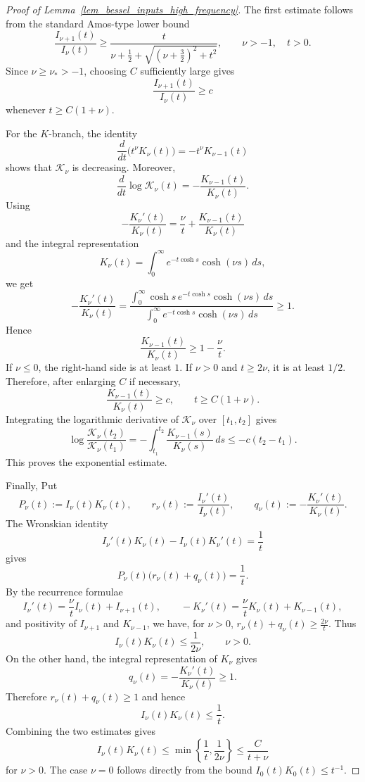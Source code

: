 \documentclass[12pt]{amsart}
\begin{document}

\begin{proof}[Proof of Lemma~\ref{lem_bessel_inputs_high_frequency}]
The first estimate follows from the standard Amos-type lower bound
\[
    \frac{I_{\nu+1}(t)}{I_\nu(t)}
    \geq
    \frac{t}
    {\nu+\frac12+\sqrt{(\nu+\frac32)^2+t^2}},
    \qquad
    \nu>-1,\quad t>0.
\]
Since $\nu\geq\nu_*>-1$, choosing $C$ sufficiently large gives
\[
    \frac{I_{\nu+1}(t)}{I_\nu(t)}
    \geq c
\]
whenever $t\geq C(1+\nu)$.

For the $K$-branch, the identity
\[
    \frac{d}{dt}\bigl(t^\nu K_\nu(t)\bigr)
    =
    -t^\nu K_{\nu-1}(t)
\]
shows that $\mathcal K_\nu$ is decreasing. Moreover,
\[
    \frac{d}{dt}\log\mathcal K_\nu(t)
    =
    -\frac{K_{\nu-1}(t)}{K_\nu(t)}.
\]
Using
\[
    -\frac{K_\nu'(t)}{K_\nu(t)}
    =
    \frac{\nu}{t}+\frac{K_{\nu-1}(t)}{K_\nu(t)}
\]
and the integral representation
\[
    K_\nu(t)=\int_0^\infty e^{-t\cosh s}\cosh(\nu s)\,ds,
\]
we get
\[
    -\frac{K_\nu'(t)}{K_\nu(t)}
    =
    \frac{\int_0^\infty \cosh s\,e^{-t\cosh s}\cosh(\nu s)\,ds}
    {\int_0^\infty e^{-t\cosh s}\cosh(\nu s)\,ds}
    \geq1.
\]
Hence
\[
    \frac{K_{\nu-1}(t)}{K_\nu(t)}
    \geq
    1-\frac{\nu}{t}.
\]
If $\nu\leq0$, the right-hand side is at least $1$. If $\nu>0$ and
$t\geq2\nu$, it is at least $1/2$. Therefore, after enlarging $C$ if necessary,
\[
    \frac{K_{\nu-1}(t)}{K_\nu(t)}\geq c,
    \qquad
    t\geq C(1+\nu).
\]
Integrating the logarithmic derivative of $\mathcal K_\nu$ over $[t_1,t_2]$
gives
\[
    \log\frac{\mathcal K_\nu(t_2)}{\mathcal K_\nu(t_1)}
    =
    -\int_{t_1}^{t_2}
    \frac{K_{\nu-1}(s)}{K_\nu(s)}\,ds
    \leq
    -c(t_2-t_1).
\]
This proves the exponential estimate.

Finally, Put
\[
    P_\nu(t):=I_\nu(t)K_\nu(t),
    \qquad
    r_\nu(t):=\frac{I_\nu'(t)}{I_\nu(t)},
    \qquad
    q_\nu(t):=-\frac{K_\nu'(t)}{K_\nu(t)}.
\]
The Wronskian identity
\[
    I_\nu'(t)K_\nu(t)-I_\nu(t)K_\nu'(t)=\frac1t
\]
gives
\[
    P_\nu(t)\bigl(r_\nu(t)+q_\nu(t)\bigr)=\frac1t.
\]
By the recurrence formulae
\[
    I_\nu'(t)=\frac{\nu}{t}I_\nu(t)+I_{\nu+1}(t),
    \qquad
    -K_\nu'(t)=\frac{\nu}{t}K_\nu(t)+K_{\nu-1}(t),
\]
and positivity of $I_{\nu+1}$ and $K_{\nu-1}$, we have, for $\nu>0$, $r_\nu(t)+q_\nu(t)\geq\frac{2\nu}{t}$. Thus
\[
    I_\nu(t)K_\nu(t)\leq\frac1{2\nu},
    \qquad
    \nu>0.
\]
On the other hand, the integral representation of $K_\nu$ gives
\[
    q_\nu(t)=-\frac{K_\nu'(t)}{K_\nu(t)}\geq1.
\]
Therefore $r_\nu(t)+q_\nu(t)\geq1$ and hence
\[
    I_\nu(t)K_\nu(t)\leq\frac1t.
\]
Combining the two estimates gives
\[
    I_\nu(t)K_\nu(t)
    \leq
    \min\left\{\frac1t,\frac1{2\nu}\right\}
    \leq
    \frac{C}{t+\nu}
\]
for $\nu>0$. The case $\nu=0$ follows directly from the bound
$I_0(t)K_0(t)\leq t^{-1}$.
\end{proof}
\end{document}
